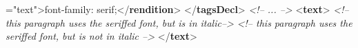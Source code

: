 \begin{shaded}
{\hspace*{1em}\hspace*{1em}{selector}="{text}">}font-family: serif;{</\textbf{rendition}>}\mbox{}\newline 
{</\textbf{tagsDecl}>}\mbox{}\newline 
\textit{<!-- ... -->}\mbox{}\newline 
{<\textbf{text}>}\mbox{}\newline 
{}\mbox{}\newline 
\hspace*{1em}\mbox{}\newline 
\hspace*{1em}\hspace*{1em}\mbox{}\newline 
\textit{<!-- this paragraph uses the seriffed font, but is in italic-->}\mbox{}\newline 
\hspace*{1em}\hspace*{1em}\mbox{}\newline 
\hspace*{1em}\hspace*{1em}\mbox{}\newline 
\textit{<!-- this paragraph uses the seriffed font, but is not in italic -->}\mbox{}\newline 
\hspace*{1em}\hspace*{1em}\mbox{}\newline 
\hspace*{1em}\mbox{}\newline 
{}\mbox{}\newline 
{</\textbf{text}>}\end{shaded}\egroup\par \par
